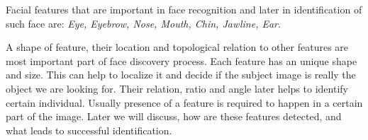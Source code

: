 Facial features that are important in face recognition and later in identification of such face are: \textit{Eye, Eyebrow, Nose, Mouth, Chin, Jawline, Ear}.

A shape of feature, their location and topological relation to other features are most important part of face discovery process. Each feature has an unique shape and size. This can help to localize it and decide if the subject image is really the object we are looking for. Their relation, ratio and angle later helps to identify certain individual. Usually presence of a feature is required to happen in a certain part of the image. Later we will discuss, how are these features detected, and what leads to successful identification.


